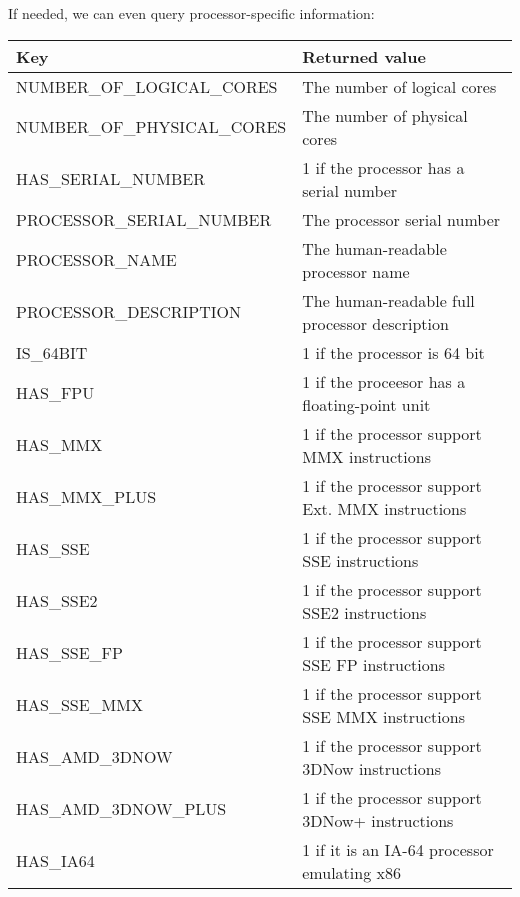 If needed, we can even query processor-specific information:

\begin{table}[H]
	\begin{tabular}{|l|l|}
		\hline
		\textbf{Key}                & \textbf{Returned value}                          \\ \hline
		NUMBER\_OF\_LOGICAL\_CORES  & The number of logical cores                      \\ \hline
		NUMBER\_OF\_PHYSICAL\_CORES & The number of physical cores                     \\ \hline
		HAS\_SERIAL\_NUMBER         & 1 if the processor has a serial number           \\ \hline
		PROCESSOR\_SERIAL\_NUMBER   & The processor serial number                      \\ \hline
		PROCESSOR\_NAME             & The human-readable processor name                \\ \hline
		PROCESSOR\_DESCRIPTION      & The human-readable full processor description    \\ \hline
		IS\_64BIT                   & 1 if the processor is 64 bit                     \\ \hline
		HAS\_FPU                    & 1 if the proceesor has a floating-point unit     \\ \hline
		HAS\_MMX                    & 1 if the processor support MMX instructions      \\ \hline
		HAS\_MMX\_PLUS              & 1 if the processor support Ext. MMX instructions \\ \hline
		HAS\_SSE                    & 1 if the processor support SSE instructions      \\ \hline
		HAS\_SSE2                   & 1 if the processor support SSE2 instructions     \\ \hline
		HAS\_SSE\_FP                & 1 if the processor support SSE FP instructions   \\ \hline
		HAS\_SSE\_MMX               & 1 if the processor support SSE MMX instructions  \\ \hline
		HAS\_AMD\_3DNOW             & 1 if the processor support 3DNow instructions    \\ \hline
		HAS\_AMD\_3DNOW\_PLUS       & 1 if the processor support 3DNow+ instructions   \\ \hline
		HAS\_IA64                   & 1 if it is an IA-64 processor emulating x86      \\ \hline
	\end{tabular}
\end{table}

